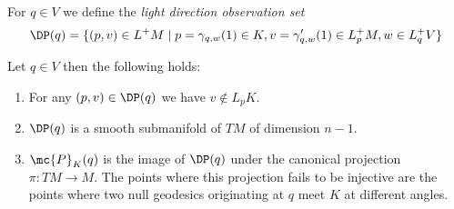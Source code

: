 \begin{definition}
For $q \in V$ we define the \emph{light direction observation set}
\begin{equation*}
    \DP(q) = \{(p,v) \in L^+M \mid p=\gamma_{q,w}(1)\in K, v=\gamma'_{q,w}(1)\in L^+_pM, w\in L^+_qV\}
\end{equation*}
\end{definition}

\begin{proposition}\label{prop:trans}
Let $q\in V$ then the following holds: 
\begin{enumerate}[label={\textnormal{(\arabic*)}}]
    \item For any $(p,v) \in \DP(q)$ we have $v\notin L_pK$.
    \item $\DP(q)$ is a smooth submanifold of $TM$ of dimension $n-1$.
    \item $\mc{P}_K(q)$ is the image of $\DP(q)$ under the canonical projection $\pi:TM\to M$. The points where this projection fails to be injective are the points where two null geodesics originating at $q$ meet $K$ at different angles.
\end{enumerate}
\end{proposition}
